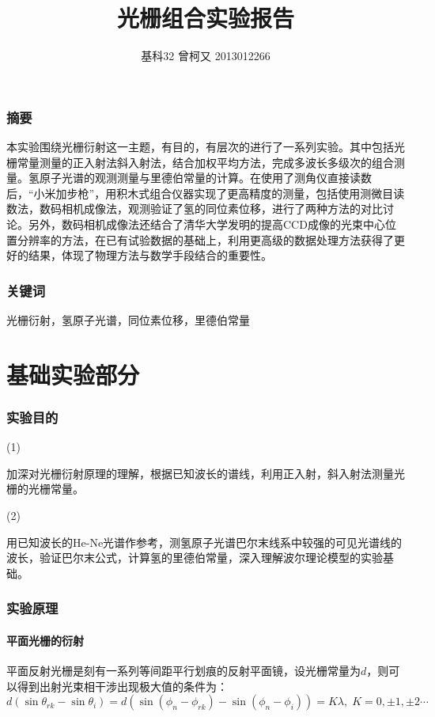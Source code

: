 \documentclass[8pt,a4paper,nocap]{ctexart}
\begin{document}
	\title{光栅组合实验报告}
	\author{基科32 曾柯又 2013012266}
	\date{\vspace{-5ex}}
	\maketitle
	 \section{摘要}
	 本实验围绕光栅衍射这一主题，有目的，有层次的进行了一系列实验。其中包括光栅常量测量的正入射法斜入射法，结合加权平均方法，完成多波长多级次的组合测量。氢原子光谱的观测测量与里德伯常量的计算。在使用了测角仪直接读数后，“小米加步枪”，用积木式组合仪器实现了更高精度的测量，包括使用测微目读数法，数码相机成像法，观测验证了氢的同位素位移，进行了两种方法的对比讨论。另外，数码相机成像法还结合了清华大学发明的提高CCD成像的光束中心位置分辨率的方法，在已有试验数据的基础上，利用更高级的数据处理方法获得了更好的结果，体现了物理方法与数学手段结合的重要性。
	 \section{关键词}
	 光栅衍射，氢原子光谱，同位素位移，里德伯常量
	\part{基础实验部分}
	\section{实验目的}
	\subparagraph{(1)}加深对光栅衍射原理的理解，根据已知波长的谱线，利用正入射，斜入射法测量光栅的光栅常量。
	\subparagraph{(2)}用已知波长的He-Ne光谱作参考，测氢原子光谱巴尔末线系中较强的可见光谱线的波长，验证巴尔末公式，计算氢的里德伯常量，深入理解波尔理论模型的实验基础。
	\section{实验原理}
		\subsection{平面光栅的衍射}
	平面反射光栅是刻有一系列等间距平行划痕的反射平面镜，设光栅常量为$ d $，则可以得到出射光束相干涉出现极大值的条件为：\[d(\sin\theta_{rk} - \sin\theta_i) = d(\sin(\phi_n - \phi_{rk}) - \sin(\phi_n - \phi_i))= K\lambda,\; K = 0,\pm1,\pm2 \cdots\]
	
\end{document}
